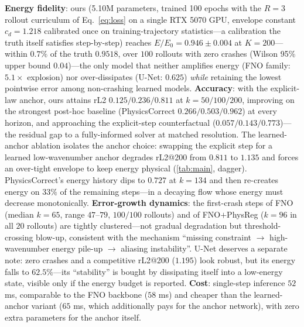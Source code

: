 \documentclass[11pt,a4paper]{article}
\begin{document}
\textbf{Energy fidelity}: ours (5.10M parameters, trained 100 epochs with the $R{=}3$ rollout curriculum of Eq.~\eqref{eq:loss} on a single RTX 5070 GPU, envelope constant $c_d{=}1.218$ calibrated once on training-trajectory statistics---a calibration the truth itself satisfies step-by-step) reaches $E/E_0=0.946\pm0.004$ at $K{=}200$---within $0.7\%$ of the truth $0.9518$, over $100$ rollouts with zero crashes (Wilson 95\% upper bound $0.04$)---the only model that neither amplifies energy (FNO family: $5.1\times$ explosion) nor over-dissipates (U-Net: $0.625$) \emph{while} retaining the lowest pointwise error among non-crashing learned models. \textbf{Accuracy}: with the explicit-law anchor, ours attains rL2 $0.125/0.236/0.811$ at $k{=}50/100/200$, improving on the strongest post-hoc baseline (PhysicsCorrect $0.266/0.503/0.962$) at every horizon, and approaching the explicit-step counterfactual ($0.057/0.143/0.773$)---the residual gap to a fully-informed solver at matched resolution. The learned-anchor ablation isolates the anchor choice: swapping the explicit step for a learned low-wavenumber anchor degrades rL2@200 from $0.811$ to $1.135$ and forces an over-tight envelope to keep energy physical (\ref{tab:main}, dagger). PhysicsCorrect's energy history dips to $0.727$ at $k{=}134$ and then re-creates energy on $33\%$ of the remaining steps---in a decaying flow whose energy must decrease monotonically. \textbf{Error-growth dynamics}: the first-crash steps of FNO (median $k{=}65$, range $47$--$79$, $100/100$ rollouts) and of FNO$+$PhysReg ($k{=}96$ in all $20$ rollouts) are tightly clustered---not gradual degradation but threshold-crossing blow-up, consistent with the mechanism ``missing constraint $\to$ high-wavenumber energy pile-up $\to$ aliasing instability''. U-Net deserves a separate note: zero crashes and a competitive rL2@200 ($1.195$) look robust, but its energy falls to $62.5\%$---its ``stability'' is bought by dissipating itself into a low-energy state, visible only if the energy budget is reported. \textbf{Cost}: single-step inference $52$ ms, comparable to the FNO backbone ($58$ ms) and cheaper than the learned-anchor variant ($65$ ms, which additionally pays for the anchor network), with zero extra parameters for the anchor itself.
\end{document}
